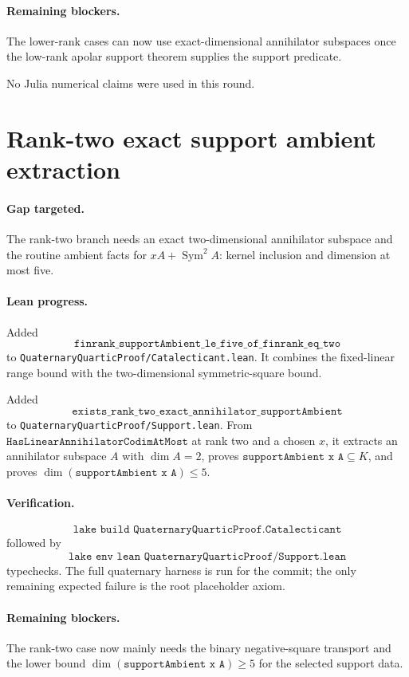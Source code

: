 \documentclass[11pt]{article}
\begin{document}
\paragraph{Remaining blockers.}
The lower-rank cases can now use exact-dimensional annihilator subspaces once
the low-rank apolar support theorem supplies the support predicate.

No Julia numerical claims were used in this round.

\section*{Rank-two exact support ambient extraction}

\paragraph{Gap targeted.}
The rank-two branch needs an exact two-dimensional annihilator subspace and
the routine ambient facts for \(xA+\operatorname{Sym}^2 A\): kernel inclusion
and dimension at most five.

\paragraph{Lean progress.}
Added
\[
\texttt{finrank\_supportAmbient\_le\_five\_of\_finrank\_eq\_two}
\]
to \texttt{QuaternaryQuarticProof/Catalecticant.lean}.  It combines the
fixed-linear range bound with the two-dimensional symmetric-square bound.

Added
\[
\texttt{exists\_rank\_two\_exact\_annihilator\_supportAmbient}
\]
to \texttt{QuaternaryQuarticProof/Support.lean}.  From
\(\texttt{HasLinearAnnihilatorCodimAtMost}\) at rank two and a chosen \(x\), it
extracts an annihilator subspace \(A\) with \(\dim A=2\), proves
\(\texttt{supportAmbient x A}\subseteq K\), and proves
\(\dim(\texttt{supportAmbient x A})\le5\).

\paragraph{Verification.}
\[
\texttt{lake build QuaternaryQuarticProof.Catalecticant}
\]
followed by
\[
\texttt{lake env lean QuaternaryQuarticProof/Support.lean}
\]
typechecks.  The full quaternary harness is run for the commit; the only
remaining expected failure is the root placeholder axiom.

\paragraph{Remaining blockers.}
The rank-two case now mainly needs the binary negative-square transport and
the lower bound \(\dim(\texttt{supportAmbient x A})\ge5\) for the selected
support data.
\end{document}
